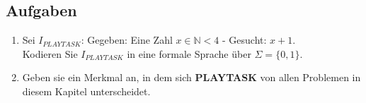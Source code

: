 \subsection*{Aufgaben}
\begin{enumerate}
    \item Sei $I_{PLAYTASK}$: Gegeben: Eine Zahl $x \in \mathbb{N} < 4$ - Gesucht: $x + 1$.\\
        Kodieren Sie $I_{PLAYTASK}$ in eine formale Sprache über $\Sigma = \{0,1\}$.
    \item Geben sie ein Merkmal an, in dem sich \textbf{PLAYTASK} von allen Problemen
        in diesem Kapitel unterscheidet.
\end{enumerate}
